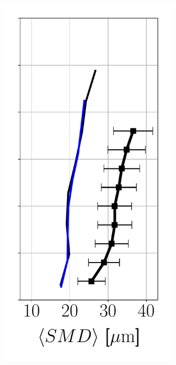 \begin{figure}[ht]
\begin{subfigure}[b]{0.2\textwidth}
   \includegraphics[scale=0.35]{./part2_developments/figures_ch6_lagrangian_JICF/params_f0/profiles/SMD_along_z}
\end{subfigure}
\hspace*{0.1in}

\end{figure}
